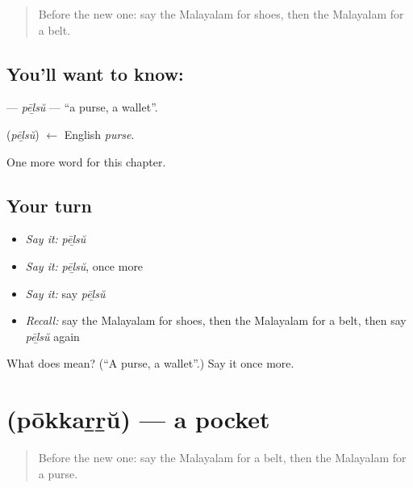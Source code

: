 \label{lesson:ML-C286-pelsu}



\begin{quote}
Before the new one: say the Malayalam for shoes, then the Malayalam for a belt.
\end{quote}

\subsection*{You'll want to know: }
\textbf{} — \emph{pēḻsŭ} — \textquotedblleft{}a purse, a wallet\textquotedblright{}.

\begin{cousinweb}
\textbf{} (\emph{pēḻsŭ}) $\leftarrow$ English \emph{purse}.
\end{cousinweb}

\begin{grammarlens}[title={What you've built}]
One more word for this chapter.
\end{grammarlens}

\subsection*{Your turn}
\begin{itemize}
\raggedright
  \item \emph{Say it:} \emph{pēḻsŭ}
  \item \emph{Say it:} \emph{pēḻsŭ}, once more
  \item \emph{Say it:} say \emph{pēḻsŭ}
  \item \emph{Recall:} say the Malayalam for shoes, then the Malayalam for a belt, then say \emph{pēḻsŭ} again
\end{itemize}

\begin{tcolorbox}[breakable,colback=teal!4,colframe=teal!35!black,title={Before you move on}]
What does  mean? (\textquotedblleft{}A purse, a wallet\textquotedblright{}.) Say it once more.
\end{tcolorbox}
\section[\texorpdfstring{\ml{പോക്കറ്റ്} (pōkkaṟṟŭ)}{പോക്കറ്റ് (pōkkaṟṟŭ)}]{ (pōkkaṟṟŭ) — a pocket}

\label{lesson:ML-C286-pokkarru}



\begin{quote}
Before the new one: say the Malayalam for a belt, then the Malayalam for a purse.
\end{quote}

